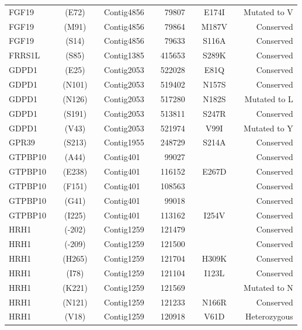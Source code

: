 \begin{center}
\begin{longtable}{lccclcrcccr}
FGF19    & & (E72)   & & Contig4856 & & 79807    & & E174I   & & Mutated to V   \\
FGF19    & & (M91)   & & Contig4856 & & 79864    & & M187V   & & Conserved      \\
FGF19    & & (S14)   & & Contig4856 & & 79633    & & S116A   & & Conserved      \\
FRRS1L   & & (S85)   & & Contig1385 & & 415653   & & S289K   & & Conserved      \\
GDPD1    & & (E25)   & & Contig2053 & & 522028   & & E81Q    & & Conserved      \\
GDPD1    & & (N101)  & & Contig2053 & & 519402   & & N157S   & & Conserved      \\
GDPD1    & & (N126)  & & Contig2053 & & 517280   & & N182S   & & Mutated to L   \\
GDPD1    & & (S191)  & & Contig2053 & & 513811   & & S247R   & & Conserved      \\
GDPD1    & & (V43)   & & Contig2053 & & 521974   & & V99I    & & Mutated to Y   \\
GPR39    & & (S213)  & & Contig1955 & & 248729   & & S214A   & & Conserved      \\
GTPBP10  & & (A44)   & & Contig401  & & 99027    & &         & & Conserved      \\
GTPBP10  & & (E238)  & & Contig401  & & 116152   & & E267D   & & Conserved      \\
GTPBP10  & & (F151)  & & Contig401  & & 108563   & &         & & Conserved      \\
GTPBP10  & & (G41)   & & Contig401  & & 99018    & &         & & Conserved      \\
GTPBP10  & & (I225)  & & Contig401  & & 113162   & & I254V   & & Conserved      \\
HRH1     & & (-202)  & & Contig1259 & & 121479   & &         & & Conserved      \\
HRH1     & & (-209)  & & Contig1259 & & 121500   & &         & & Conserved      \\
HRH1     & & (H265)  & & Contig1259 & & 121704   & & H309K   & & Conserved      \\
HRH1     & & (I78)   & & Contig1259 & & 121104   & & I123L   & & Conserved      \\
HRH1     & & (K221)  & & Contig1259 & & 121569   & &         & & Mutated to N   \\
HRH1     & & (N121)  & & Contig1259 & & 121233   & & N166R   & & Conserved      \\
HRH1     & & (V18)   & & Contig1259 & & 120918   & & V61D    & & Heterozygous   \\

\end{longtable}
\end{center}
